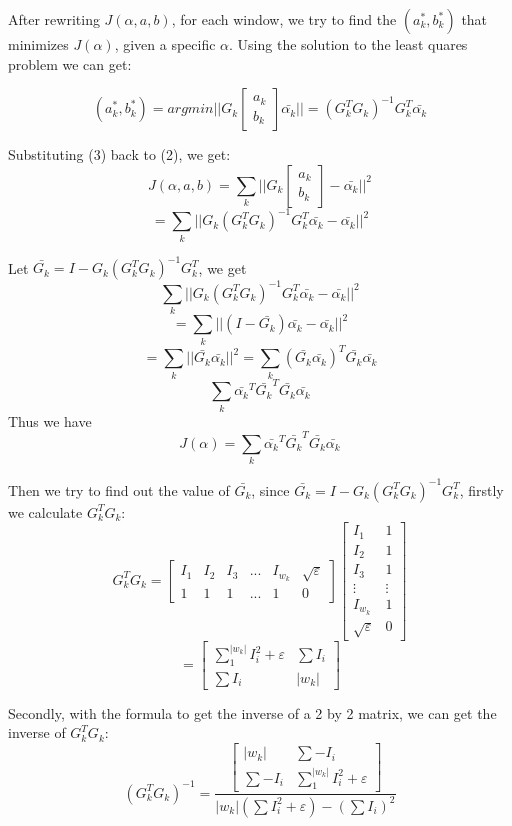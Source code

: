 \documentclass[11pt,letterpaper]{article}
\begin{document}
After rewriting $J(\alpha, a, b)$, for each window, we try to find the $(a_k^*, b_k^*)$ that minimizes $J(\alpha)$, given a specific $\alpha$. Using the solution to the least quares problem we can get:

\begin{equation}
(a_k^*, b_k^*) = argmin||G_k \begin{bmatrix} a_k \\ b_k\end{bmatrix} \bar{\alpha_k}|| = (G_k^TG_k)^{-1}G_k^T \bar{\alpha_k}
\end{equation}

Substituting (3) back to (2), we get:
$$J(\alpha, a, b) = \sum_{k}||G_k \begin{bmatrix} a_k \\ b_k\end{bmatrix} - \bar{\alpha_k}||^2 $$
$$= \sum_{k}||G_k(G_k^TG_k)^{-1}G_k^T \bar{\alpha_k} - \bar{\alpha_k}||^2$$

Let $\bar{G_k} = I - G_k(G_k^T G_k)^{-1}G_k^T$, we get
$$\sum_{k}||G_k(G_k^TG_k)^{-1}G_k^T \bar{\alpha_k} - \bar{\alpha_k}||^2$$
$$ = \sum_{k}|| (I - \bar{G_k})\bar{\alpha_k} - \bar{\alpha_k}||^2 $$
$$ = \sum_{k}|| \bar{G_k}\bar{\alpha_k}||^2 = \sum_{k} (\bar{G_k}\bar{\alpha_k})^T \bar{G_k}\bar{\alpha_k} $$
$$ \sum_{k} \bar{\alpha_k}^T\bar{G_k}^T \bar{G_k}\bar{\alpha_k}$$
Thus we have
$$J(\alpha) = \sum_{k} \bar{\alpha_k}^T\bar{G_k}^T \bar{G_k}\bar{\alpha_k}$$

Then we try to find out the value of $\bar{G_k}$, since $\bar{G_k} = I - G_k(G_k^T G_k)^{-1}G_k^T$, firstly we calculate $G_k^TG_k$: 
$$G_k^TG_k = \begin{bmatrix}
    I_1 & I_2 & I_3 & ... & I_{w_k} & \sqrt{\varepsilon}\\
    1 & 1 & 1 & ... & 1 & 0 
  \end{bmatrix}
  \begin{bmatrix}
    I_1 & 1 \\ I_2 & 1 \\ I_3 & 1 \\ \vdots & \vdots \\ I_{w_k} & 1 \\ \sqrt{\varepsilon} & 0 
  \end{bmatrix} $$
$$ = \begin{bmatrix}
    \sum_{1}^{|w_k|} I_i^2 + \varepsilon & \sum I_i \\
    \sum I_i & |w_k|
  \end{bmatrix}$$

Secondly, with the formula to get the inverse of a 2 by 2 matrix, we can get the inverse of $G_k^TG_k$: 
$$(G_k^TG_k)^{-1} = \frac{\begin{bmatrix}
    |w_k| & \sum -I_i \\
    \sum -I_i & \sum_{1}^{|w_k|} I_i^2 + \varepsilon
  \end{bmatrix}}{|w_k|(\sum I_i^2 + \varepsilon) - (\sum I_i)^2} 
  $$
\end{document}
